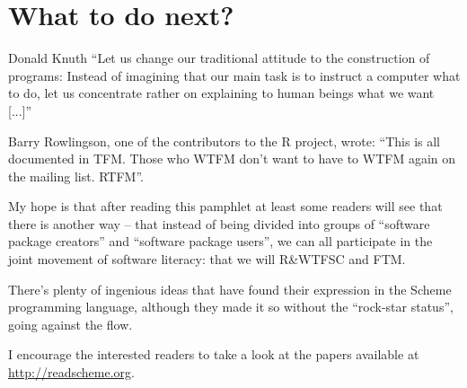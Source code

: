 \chapter*{What to do next?}

\begin{chapquote}{Donald Knuth}
``Let us change our traditional attitude to the construction
of programs: Instead of imagining that our main task is to
instruct a computer what to do, let us concentrate rather
on explaining to human beings what we want [...]''
\end{chapquote}

Barry Rowlingson, one of the contributors to the R project,
wrote: ``This is all documented in TFM. Those who WTFM
don't want to have to WTFM again on the mailing list. RTFM''.

My hope is that after reading this pamphlet at least some
readers will see that there is another way -- that instead
of being divided into groups of ``software package creators''
and ``software package users'', we can all participate
in the joint movement of software literacy: that we will
R\&WTFSC and FTM. 

There's plenty of ingenious ideas that have found their
expression in the Scheme programming language, although
they made it so without the ``rock-star status'', going
against the flow.

I encourage the interested readers to take a look at the papers
available at \url{http://readscheme.org}.

